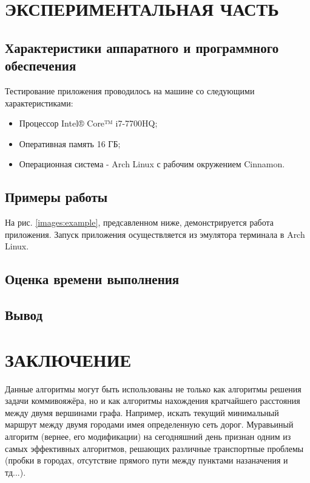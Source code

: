 \documentclass[a4paper,12pt]{article}
\newcommand{\anonsection}[1]{\section*{#1}\addcontentsline{toc}{section}{#1}}
\begin{document}
\newpage
\section{ЭКСПЕРИМЕНТАЛЬНАЯ ЧАСТЬ}
\subsection{Характеристики аппаратного и программного обеспечения}
Тестирование приложения проводилось на машине со следующими характеристиками:\\
\begin{itemize}
\item Процессор Intel® Core™ i7-7700HQ;
\item Оперативная память 16 ГБ;
\item Операционная система - Arch Linux с рабочим окружением Cinnamon.
\end{itemize}

\newpage
\subsection{Примеры работы}
На рис. \ref{images:example}, предсавленном ниже, демонстрируется работа приложения. Запуск приложения осуществляется из эмулятора терминала в Arch Linux.

\newpage
\subsection{Оценка времени выполнения}

\newpage
\subsection{Вывод}

\newpage
\anonsection{ЗАКЛЮЧЕНИЕ}
Данные алгоритмы могут быть использованы не только как алгоритмы решения задачи коммивояжёра, но и как алгоритмы нахождения кратчайшего расстояния между двумя вершинами графа. Например, искать текущий минимальный маршрут между двумя городами имея определенную сеть дорог.
Муравьиный алгоритм (вернее, его модификации) на сегодняшний день признан одним из самых эффективных алгоритмов, решающих различные транспортные проблемы (пробки в городах, отсутствие прямого пути между пунктами назаначения и тд...).
\end{document}
